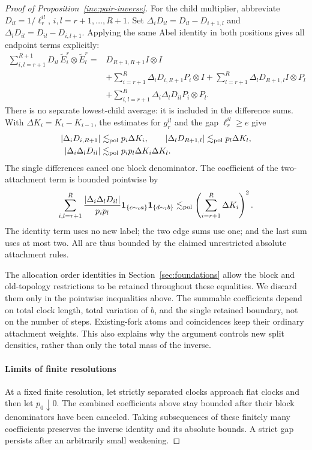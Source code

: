 \begin{proof}[Proof of Proposition~\ref{inv:pair-inverse}]
For the child multiplier, abbreviate \(D_{il}=1/\ell_r^{il}\),
\(i,l=r+1,\ldots,R+1\). Set
\(\Delta_iD_{il}=D_{il}-D_{i+1,l}\) and
\(\Delta_lD_{il}=D_{il}-D_{i,l+1}\). Applying the same Abel identity
in both positions gives all endpoint terms explicitly:
\[
\begin{split}
 \sum_{i,l=r+1}^{R+1}D_{il}\,
       \widetilde E_i^r\otimes\widetilde E_l^r
 ={}&D_{R+1,R+1}I\otimes I\\
 &+\sum_{i=r+1}^{R}\Delta_iD_{i,R+1}P_i\otimes I
  +\sum_{l=r+1}^{R}\Delta_lD_{R+1,l}I\otimes P_l\\
 &+\sum_{i,l=r+1}^{R}\Delta_i\Delta_lD_{il}P_i\otimes P_l .
\end{split}
\]
There is no separate lowest-child average: it is included in the
difference sums. With \(\Delta K_i=K_i-K_{i-1}\), the estimates for
\(g_r^{il}\) and the gap \(\ell_r^{il}\ge e\) give
\[
\begin{split}
 |\Delta_iD_{i,R+1}|&\lesssim_{\rm pol}p_i\Delta K_i,\qquad
 |\Delta_lD_{R+1,l}|\lesssim_{\rm pol}p_l\Delta K_l,\\
 |\Delta_i\Delta_lD_{il}|
       &\lesssim_{\rm pol}p_i p_l\Delta K_i\Delta K_l .
\end{split}
\]
The single differences cancel one block denominator. The coefficient
of the two-attachment term is bounded pointwise by
\[
 \sum_{i,l=r+1}^{R}
 \frac{|\Delta_i\Delta_lD_{il}|}{p_i p_l}
 {\bf1}_{\{c\sim_i a\}}{\bf1}_{\{d\sim_l b\}}
 \lesssim_{\rm pol}
 \left(\sum_{i=r+1}^{R}\Delta K_i\right)^2 .
\]
The identity term uses no new label; the two edge sums use one; and the
last sum uses at most two. All are thus bounded by the claimed
unrestricted absolute attachment rules.

The allocation order identities in Section~\ref{sec:foundations} allow
the block and old-topology restrictions to be retained throughout these
equalities. We discard them only in the pointwise inequalities above.
The summable coefficients depend on total clock length, total variation
of \(b\), and the single retained boundary, not on the number of steps.
Existing-fork atoms and coincidences keep their ordinary attachment
weights. This also explains why the argument controls new split
densities, rather than only the total mass of the inverse.

\paragraph{Limits of finite resolutions}\label{par:inverse-limits}
At a fixed finite resolution, let strictly separated clocks approach
flat clocks and then let \(p_0\downarrow0\). The combined coefficients
above stay bounded after their block denominators have been canceled.
Taking subsequences of these finitely many coefficients preserves the
inverse identity and its absolute bounds. A strict gap persists after
an arbitrarily small weakening.


\end{proof}
